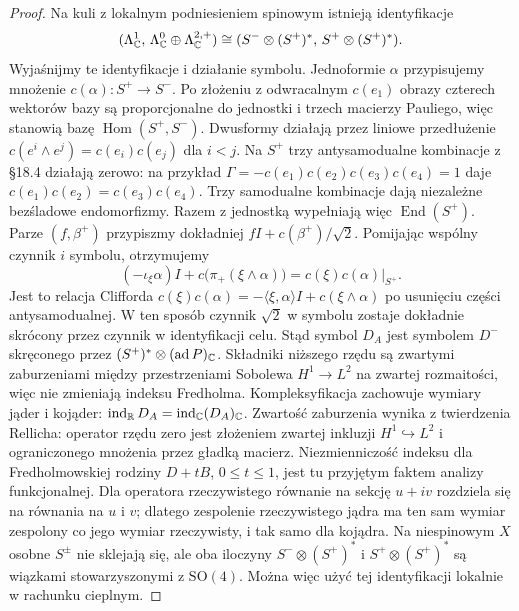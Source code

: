 \begin{proof}
Na kuli z lokalnym podniesieniem spinowym
istnieją identyfikacje
\[
 (\Lambda^1_{\mathbb{C}},\,
   \Lambda^0_{\mathbb{C}}\oplus\Lambda^{2,+}_{\mathbb{C}})
 \cong
 (S^-\otimes(S^+)^*,\,S^+\otimes(S^+)^*).
\]
Wyjaśnijmy te identyfikacje i działanie symbolu.
Jednoformie $\alpha$ przypisujemy mnożenie
$c(\alpha):S^+\to S^-$.
Po złożeniu z odwracalnym $c(e_1)$ obrazy czterech
wektorów bazy są proporcjonalne do jednostki i trzech
macierzy Pauliego, więc stanowią bazę
$\operatorname{Hom}(S^+,S^-)$.
Dwusformy działają przez liniowe przedłużenie
$c(e^i\wedge e^j)=c(e_i)c(e_j)$ dla $i<j$.
Na $S^+$ trzy antysamodualne kombinacje z §18.4 działają zerowo:
na przykład $\Gamma=-c(e_1)c(e_2)c(e_3)c(e_4)=1$
daje $c(e_1)c(e_2)=c(e_3)c(e_4)$.
Trzy samodualne kombinacje dają niezależne bezśladowe
endomorfizmy. Razem z jednostką wypełniają więc
$\operatorname{End}(S^+)$.
Parze $(f,\beta^+)$ przypiszmy dokładniej
$fI+c(\beta^+)/\sqrt2$.
Pomijając wspólny czynnik $i$ symbolu, otrzymujemy
\[
 (-\iota_\xi\alpha)I+
 c\bigl(\pi_+(\xi\wedge\alpha)\bigr)
 =c(\xi)c(\alpha)|_{S^+}.
\]
Jest to relacja Clifforda
$c(\xi)c(\alpha)=-\langle\xi,\alpha\rangle I
+c(\xi\wedge\alpha)$ po usunięciu części antysamodualnej.
W ten sposób czynnik $\sqrt2$ w symbolu zostaje dokładnie
skrócony przez czynnik w identyfikacji celu.
Stąd symbol \(D_A\) jest symbolem
\(D^-\) skręconego przez
\((S^+)^*\otimes(\operatorname{ad}P)_{\mathbb{C}}\).
Składniki niższego rzędu są zwartymi
zaburzeniami między przestrzeniami
Sobolewa \(H^1\to L^2\) na zwartej
rozmaitości, więc nie zmieniają indeksu
Fredholma. Kompleksyfikacja zachowuje
wymiary jąder i kojąder:
\(\operatorname{ind}_{\mathbb{R}}D_A
=\operatorname{ind}_{\mathbb{C}}(D_A)_{\mathbb{C}}\).
Zwartość zaburzenia wynika z twierdzenia Rellicha:
operator rzędu zero jest złożeniem zwartej inkluzji
$H^1\hookrightarrow L^2$ i ograniczonego mnożenia przez
gładką macierz. Niezmienniczość indeksu dla
Fredholmowskiej rodziny $D+tB$, $0\leq t\leq1$,
jest tu przyjętym faktem analizy funkcjonalnej.
Dla operatora rzeczywistego równanie na sekcję $u+iv$
rozdziela się na równania na $u$ i $v$;
dlatego zespolenie rzeczywistego jądra ma ten sam wymiar
zespolony co jego wymiar rzeczywisty, i tak samo dla kojądra.
Na niespinowym \(X\) osobne
\(S^\pm\) nie sklejają się, ale oba
iloczyny \(S^-\otimes(S^+)^*\) i
\(S^+\otimes(S^+)^*\) są wiązkami
stowarzyszonymi z \(\mathrm{SO}(4)\).
Można więc użyć tej identyfikacji
lokalnie w rachunku cieplnym.


\end{proof}
